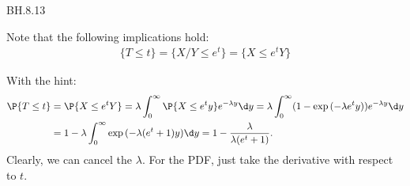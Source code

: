 
\setcounter{theorem}{12}
\begin{exercise}BH.8.13
\begin{hint}
Note that the following implications hold:
\begin{align*}
\{T\leq t\} = \{X/Y \leq e^{t}\} = \{X \leq e^t Y\}
\end{align*}
\end{hint}
\begin{solution}
With the hint:
\begin{align*}
\P{T\leq t}
  &= \P{X \leq e^t Y} = \lambda \int_0^{\infty} \P{X\leq e^{t}y} e^{-\lambda y} \d y
  = \lambda \int_0^{\infty} (1- \exp{(-\lambda e^{t} y)}) e^{-\lambda y}\d y \\
&= 1 - \lambda \int_0^{\infty} \exp{(-\lambda (e^{t}+1) y)} \d y = 1-\frac{\lambda}{\lambda(e^{t}+1)}.
\end{align*}
Clearly, we can cancel the $\lambda$. For the PDF, just take the derivative with respect to $t$.
\end{solution}
\end{exercise}

